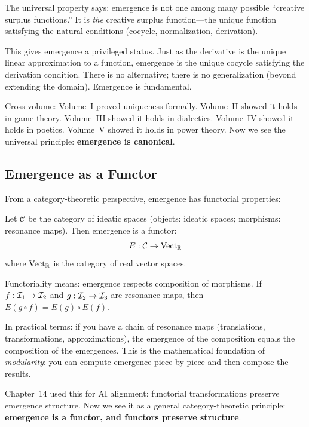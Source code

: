 \begin{interpretation}
The universal property says: emergence is not one among many possible
``creative surplus functions.'' It is \emph{the} creative surplus function---the
unique function satisfying the natural conditions (cocycle, normalization,
derivation).

This gives emergence a privileged status. Just as the derivative is the unique
linear approximation to a function, emergence is the unique cocycle satisfying
the derivation condition. There is no alternative; there is no generalization
(beyond extending the domain). Emergence is fundamental.

Cross-volume: Volume~I proved uniqueness formally. Volume~II showed it holds
in game theory. Volume~III showed it holds in dialectics. Volume~IV showed it
holds in poetics. Volume~V showed it holds in power theory. Now we see the
universal principle: \textbf{emergence is canonical}.
\end{interpretation}

\subsection{Emergence as a Functor}

From a category-theoretic perspective, emergence has functorial properties:

\begin{theorem}
\label{thm:functoriality-full}
Let $\mathcal{C}$ be the category of ideatic spaces (objects: ideatic spaces;
morphisms: resonance maps). Then emergence is a functor:
\[
  E : \mathcal{C} \to \text{Vect}_{\mathbb{R}}
\]
where $\text{Vect}_{\mathbb{R}}$ is the category of real vector spaces.
\end{theorem}

\begin{interpretation}
Functoriality means: emergence respects composition of morphisms. If $f :
\mathcal{I}_1 \to \mathcal{I}_2$ and $g : \mathcal{I}_2 \to \mathcal{I}_3$ are resonance maps, then $E(g
\circ f) = E(g) \circ E(f)$.

In practical terms: if you have a chain of resonance maps (translations,
transformations, approximations), the emergence of the composition equals the
composition of the emergences. This is the mathematical foundation of
\emph{modularity}: you can compute emergence piece by piece and then compose
the results.

Chapter~14 used this for AI alignment: functorial transformations preserve
emergence structure. Now we see it as a general category-theoretic principle:
\textbf{emergence is a functor, and functors preserve structure}.
\end{interpretation}

